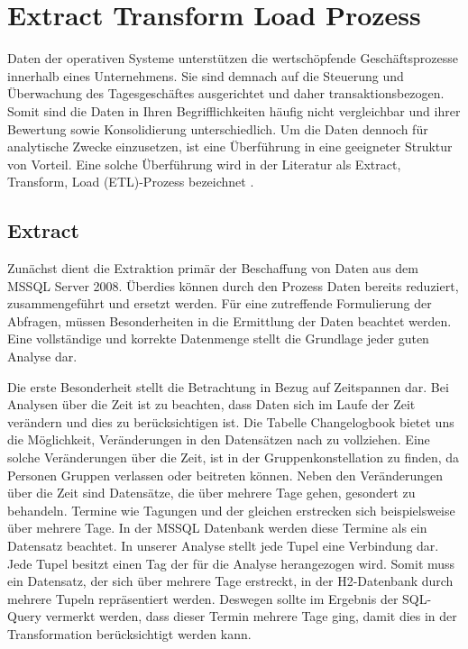 \section{Extract Transform Load Prozess}

Daten der operativen Systeme unterstützen die wertschöpfende Geschäftsprozesse innerhalb eines Unternehmens. Sie sind demnach auf die Steuerung und Überwachung des Tagesgeschäftes ausgerichtet und daher transaktionsbezogen. Somit sind die Daten in Ihren Begrifflichkeiten häufig nicht vergleichbar und ihrer Bewertung sowie Konsolidierung unterschiedlich. Um die Daten dennoch für analytische Zwecke einzusetzen, ist eine Überführung in eine geeigneter Struktur von Vorteil. Eine solche Überführung wird in der Literatur als Extract, Transform, Load (ETL)-Prozess bezeichnet \cite{ElSappagh201191}. 

\subsection{Extract}

Zunächst dient die Extraktion primär der Beschaffung von Daten aus dem MSSQL Server 2008. Überdies können durch den Prozess Daten bereits reduziert,  zusammengeführt und ersetzt werden. Für eine zutreffende Formulierung der Abfragen, müssen Besonderheiten in die Ermittlung der Daten beachtet werden. Eine vollständige und korrekte Datenmenge stellt die Grundlage jeder guten Analyse dar.

Die erste Besonderheit stellt die Betrachtung in Bezug auf Zeitspannen dar. Bei Analysen über die Zeit ist zu beachten, dass Daten sich im Laufe der Zeit verändern und dies zu berücksichtigen ist. Die Tabelle Changelogbook bietet uns die Möglichkeit, Veränderungen in den Datensätzen nach zu vollziehen. Eine solche Veränderungen über die Zeit, ist in der Gruppenkonstellation zu finden, da Personen Gruppen verlassen oder beitreten können. Neben den Veränderungen über die Zeit sind Datensätze, die über mehrere Tage gehen, gesondert zu behandeln. Termine wie Tagungen und der gleichen erstrecken sich beispielsweise über mehrere Tage. In der MSSQL Datenbank werden diese Termine als ein Datensatz beachtet. In unserer Analyse stellt jede Tupel eine Verbindung dar. Jede Tupel besitzt einen Tag der für die Analyse herangezogen wird. Somit muss ein Datensatz, der sich über mehrere Tage erstreckt, in der H2-Datenbank durch mehrere Tupeln repräsentiert werden. Deswegen sollte im Ergebnis der SQL-Query vermerkt werden, dass dieser Termin mehrere Tage ging, damit dies in der Transformation berücksichtigt werden kann. 

